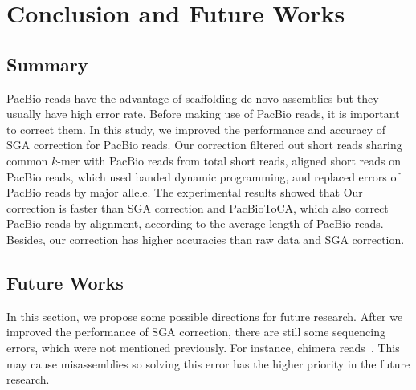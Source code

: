 \chapter{Conclusion and Future Works}

\section{Summary}
PacBio reads have the advantage of scaffolding de novo assemblies but they usually have high error rate. Before making use of PacBio reads, it is important to correct them. In this study, we improved the performance and accuracy of SGA correction for PacBio reads. Our correction filtered out short reads sharing common $k$-mer with PacBio reads from total short reads, aligned short reads on PacBio reads, which used banded dynamic programming, and replaced errors of PacBio reads by major allele. The experimental results showed that Our correction is faster than SGA correction and PacBioToCA, which also correct PacBio reads by alignment, according to the average length of PacBio reads. Besides, our correction has higher accuracies than raw data and SGA correction.

\section{Future Works}
In this section, we propose some possible directions for future research. After we improved the performance of SGA correction, there are still some sequencing errors, which were not mentioned previously. For instance, chimera reads~\cite{Koren2012}. This may cause misassemblies so solving this error has the higher priority in the future research.
